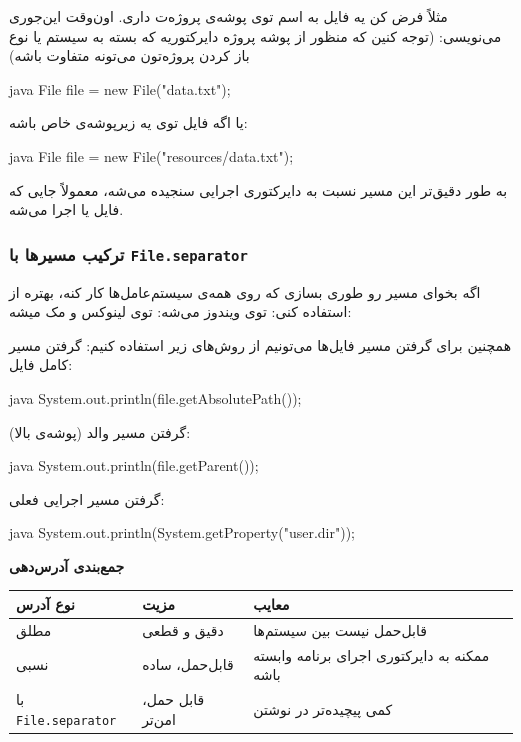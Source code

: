 مثلاً فرض کن یه فایل به اسم  توی پوشه‌ی پروژه‌ت داری.
اون‌وقت این‌جوری می‌نویسی: (توجه کنین که منظور از پوشه پروژه 
دایرکتوریه که بسته به  سیستم یا نوع باز کردن پروژه‌تون می‌تونه
متفاوت باشه)

\begin{codebox}{java}
File file = new File("data.txt");
\end{codebox}

یا اگه فایل توی یه زیرپوشه‌ی خاص باشه:

\begin{codebox}{java}
File file = new File("resources/data.txt");
\end{codebox}

به طور دقیق‌تر این مسیر نسبت به دایرکتوری اجرایی 
سنجیده می‌شه، معمولاً جایی که فایل  یا
 اجرا می‌شه.

\subsubsection{ترکیب مسیرها با \texttt{File.separator}}

اگه بخوای مسیر رو طوری بسازی که روی همه‌ی سیستم‌عامل‌ها کار کنه، بهتره از
 استفاده کنی: توی ویندوز
 می‌شه: \lr{\texttt{\textbackslash }} توی
لینوکس و مک میشه: \lr{\texttt{/}}

همچنین برای گرفتن مسیر فایل‌ها می‌تونیم از روش‌های زیر استفاده کنیم: گرفتن
مسیر کامل فایل:

\begin{codebox}{java}
System.out.println(file.getAbsolutePath());
\end{codebox}

گرفتن مسیر والد (پوشه‌ی بالا):

\begin{codebox}{java}
System.out.println(file.getParent());
\end{codebox}

گرفتن مسیر اجرایی فعلی:

\begin{codebox}{java}
System.out.println(System.getProperty("user.dir"));
\end{codebox}

\textbf{جمع‌بندی آدرس‌دهی}

\begin{table}[H]
\centering
\setLTR
\begin{tabular}{lll}
\hline
\textbf{نوع آدرس} & \textbf{مزیت} & \textbf{معایب} \\
\hline
مطلق & دقیق و قطعی & قابل‌حمل نیست بین سیستم‌ها \\
نسبی & قابل‌حمل، ساده & ممکنه به دایرکتوری اجرای برنامه وابسته باشه \\
با \texttt{File.separator} & قابل حمل، امن‌تر & کمی پیچیده‌تر در نوشتن \\
\hline
\end{tabular}
\end{table}

